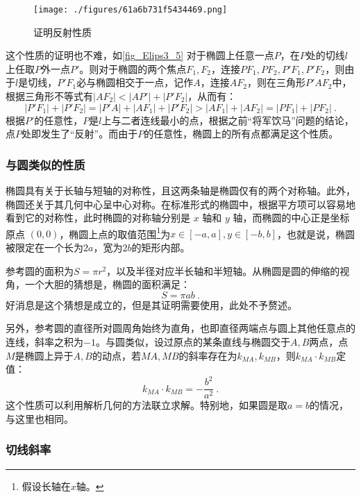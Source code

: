 \begin{figure}[ht]
\centering
\texttt{[image: ./figures/61a6b731f5434469.png]}
\caption{证明反射性质} \label{fig_Elips3_5}
\end{figure}

这个性质的证明也不难，如\autoref{fig_Elips3_5} 对于椭圆上任意一点$P$，在$P$处的切线$l$上任取$P$外一点$P'$。则对于椭圆的两个焦点$F_1,F_2$，连接$PF_1,PF_2,P'F_1,P'F_2$，则由于$l$是切线，$P'F_1$必与椭圆相交于一点，记作$A$，连接$AF_2$，则在三角形$P'AF_2$中，根据三角形不等式有$|AF_2|<|AP'|+|P'F_2|$，从而有：
\begin{equation}
|P'F_1|+|P'F_2|=|P'A|+|AF_1|+|P'F_2|>|AF_1|+|AF_2|=|PF_1|+|PF_2|~.
\end{equation}
根据$P'$的任意性，$P$是$l$上与二者连线最小的点，根据之前“将军饮马”问题的结论，点$P$处即发生了“反射”。而由于$P$的任意性，椭圆上的所有点都满足这个性质。

\subsubsection{与圆类似的性质}

椭圆具有关于长轴与短轴的对称性，且这两条轴是椭圆仅有的两个对称轴。此外，椭圆还关于其几何中心呈中心对称。在标准形式的椭圆中，根据平方项可以容易地看到它的对称性，此时椭圆的对称轴分别是 $x$ 轴和 $y$ 轴，而椭圆的中心正是坐标原点 $(0,0)$，椭圆上点的取值范围\footnote{假设长轴在$x$轴。}为$x\in[-a,a],y\in[-b,b]$，也就是说，椭圆被限定在一个长为$2a$，宽为$2b$的矩形内部。

参考圆的面积为$S = \pi r^2$，以及半径对应半长轴和半短轴。从椭圆是圆的伸缩的视角，一个大胆的猜想是，椭圆的面积满足：
\begin{equation}
S = \pi a b~.
\end{equation}
好消息是这个猜想是成立的，但是其证明需要使用，此处不予赘述。

另外，参考圆的直径所对圆周角始终为直角，也即直径两端点与圆上其他任意点的连线，斜率之积为$-1$。与圆类似，设过原点的某条直线与椭圆交于$A,B$两点，点$M$是椭圆上异于$A,B$的动点，若$MA,MB$的斜率存在为$k_{MA},k_{MB}$，则$k_{MA}\cdot k_{MB}$定值：
\begin{equation}
k_{MA} \cdot k_{MB} = -\frac{b^2}{a^2}~.
\end{equation}
这个性质可以利用解析几何的方法联立求解。特别地，如果圆是取$a=b$的情况，与这里也相同。

\subsubsection{切线斜率}

